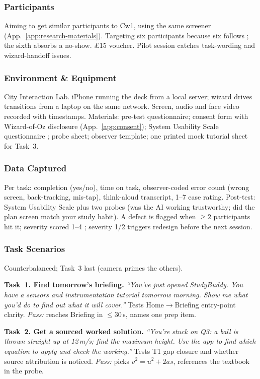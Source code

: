 \documentclass[a4paper,11pt]{article}
\begin{document}
\subsubsection*{Participants}
Aiming to get similar participants to Cw1, using the same screener
(App.~\ref{app:research-materials}). Targeting six participants because six follows
\textcite{nielsen2000}; the sixth absorbs a no-show. \pounds15
voucher. Pilot session catches task-wording and wizard-handoff
issues.

\subsubsection*{Environment \& Equipment}
City Interaction Lab. iPhone running the deck from a local
server; wizard drives transitions from a laptop on the same network.
Screen, audio and face video recorded with timestamps. Materials:
pre-test questionnaire; consent form with Wizard-of-Oz disclosure
(App.~\ref{app:consent}); System Usability Scale questionnaire
\parencite{brooke1996}; probe sheet; observer template; one printed
mock tutorial sheet for Task~3.

\subsubsection*{Data Captured}
Per task: completion (yes/no), time on task, observer-coded error
count (wrong screen, back-tracking, mis-tap), think-aloud transcript,
1--7 ease rating. Post-test: System Usability Scale plus two probes
(was the AI working trustworthy; did the plan screen match your study
habit). A defect is flagged when ${\geq}2$ participants hit it;
severity scored 1--4 \parencite{nielsen1994}; severity 1/2 triggers
redesign before the next session.

\subsubsection*{Task Scenarios}
Counterbalanced; Task~3 last (camera primes the others).

\textbf{Task~1. Find tomorrow's briefing.} \emph{``You've just opened
StudyBuddy. You have a sensors and instrumentation tutorial tomorrow
morning. Show me what you'd do to find out what it will cover.''}
Tests Home$\to$Briefing entry-point clarity. \emph{Pass:} reaches
Briefing in ${\leq}30$\,s, names one prep item.

\textbf{Task~2. Get a sourced worked solution.} \emph{``You're stuck
on Q3: a ball is thrown straight up at 12\,m/s; find the maximum
height. Use the app to find which equation to apply and check the
working.''} Tests T1 gap closure and whether source attribution is
noticed. \emph{Pass:} picks $v^2 = u^2 + 2as$, references the textbook
in the probe.
\end{document}
